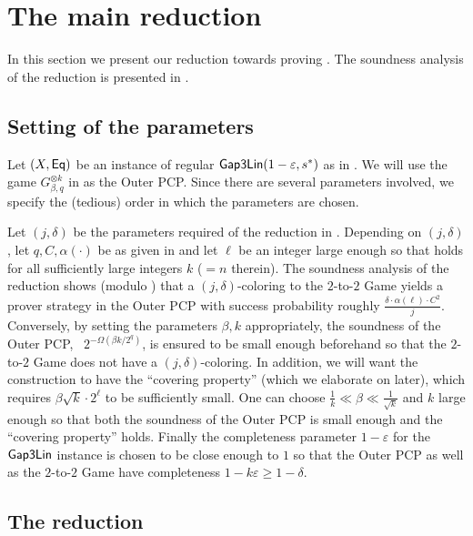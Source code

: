 \documentclass{toc}
\newcommand\eps{\varepsilon}
\renewcommand\geq{\geqslant}
\begin{document}
\section{The main reduction}\label{section:construction}
In this section we present our reduction towards proving . The soundness analysis of the reduction is
presented in .

\subsection{Setting of the parameters}

Let $(X, {\sf Eq})$ be an instance of regular  ${\sf Gap3Lin}(1-\eps, s^*)$ as in . We will use the
game $G_{\beta, q}^{\otimes k}$ in  as the Outer PCP. Since there are several parameters involved, we specify the (tedious) order in which the parameters are chosen.

Let $(j,\delta)$ be the parameters required of the reduction in . Depending on $(j,\delta)$, let $q, C, \alpha(\cdot)$ be as given in
 and let $\ell$ be an integer large enough so that  holds for all sufficiently large integers $k$ ($= n$ therein). The soundness
analysis of the reduction shows (modulo ) that a $(j,\delta)$-coloring to the $2$-to-$2$ Game yields a prover strategy in the
Outer PCP with success probability roughly $\frac{\delta\cdot \alpha(\ell) \cdot C^2}{j}$. Conversely, by setting the parameters $\beta, k$ appropriately, the
 soundness of the Outer PCP, ~$2^{-\Omega(\beta k/2^q)}$, is ensured to be small enough beforehand so that the $2$-to-$2$ Game does not have a $(j,\delta)$-coloring.
In addition, we will want the construction to have the ``covering property'' (which we elaborate on
later), which requires $\beta  \sqrt{k}\cdot 2^\ell$ to be sufficiently small. One can choose $\frac{1}{k} \ll \beta \ll
\frac{1}{\sqrt{k}}$ and $k$ large enough so that both the soundness of the Outer PCP is small enough and the ``covering property'' holds.
 Finally the completeness parameter $1-\eps$ for the ${\sf Gap3Lin}$
instance is chosen to be close enough to $1$ so that the Outer PCP as well as the $2$-to-$2$ Game have completeness $1-k\eps \geq 1-\delta$.




\subsection{The reduction}
\end{document}
